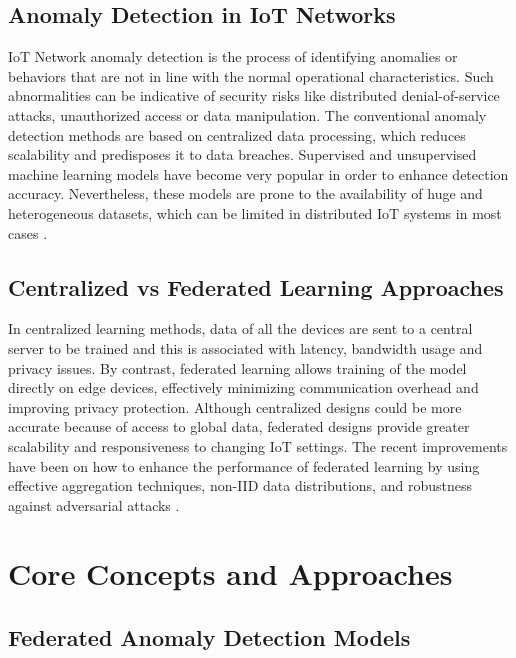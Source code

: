 \documentclass[12pt]{article}
\begin{document}
\subsection{Anomaly Detection in IoT Networks}

IoT Network anomaly detection is the process of identifying anomalies or behaviors that are not in line with the normal operational characteristics. Such abnormalities can be indicative of security risks like distributed denial-of-service attacks, unauthorized access or data manipulation. The conventional anomaly detection methods are based on centralized data processing, which reduces scalability and predisposes it to data breaches. Supervised and unsupervised machine learning models have become very popular in order to enhance detection accuracy. Nevertheless, these models are prone to the availability of huge and heterogeneous datasets, which can be limited in distributed IoT systems in most cases \cite{paper5,paper6}.

\subsection{Centralized vs Federated Learning Approaches}

In centralized learning methods, data of all the devices are sent to a central server to be trained and this is associated with latency, bandwidth usage and privacy issues. By contrast, federated learning allows training of the model directly on edge devices, effectively minimizing communication overhead and improving privacy protection. Although centralized designs could be more accurate because of access to global data, federated designs provide greater scalability and responsiveness to changing IoT settings. The recent improvements have been on how to enhance the performance of federated learning by using effective aggregation techniques, non-IID data distributions, and robustness against adversarial attacks \cite{paper7,paper8}.
	

	\section{Core Concepts and Approaches}
	
\subsection{Federated Anomaly Detection Models}
\end{document}

